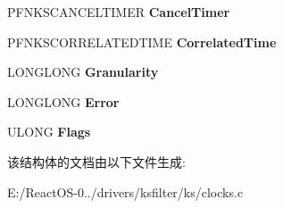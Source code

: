 \begin{DoxyCompactItemize}
P\+F\+N\+K\+S\+C\+A\+N\+C\+E\+L\+T\+I\+M\+ER {\bfseries Cancel\+Timer}
\item 
\mbox{\label{struct_k_s_i_d_e_f_a_u_l_t_c_l_o_c_k_a567669adb15a45915bfb7151dac7fe47}} 
P\+F\+N\+K\+S\+C\+O\+R\+R\+E\+L\+A\+T\+E\+D\+T\+I\+ME {\bfseries Correlated\+Time}
\item 
\mbox{\label{struct_k_s_i_d_e_f_a_u_l_t_c_l_o_c_k_abf29c368b4950bcdcbd4c32eb2d3ba41}} 
L\+O\+N\+G\+L\+O\+NG {\bfseries Granularity}
\item 
\mbox{\label{struct_k_s_i_d_e_f_a_u_l_t_c_l_o_c_k_ad7ea074a9b3ae8540d6d1be4d7dca30c}} 
L\+O\+N\+G\+L\+O\+NG {\bfseries Error}
\item 
\mbox{\label{struct_k_s_i_d_e_f_a_u_l_t_c_l_o_c_k_a713a556063e70584a73216e0a86ba029}} 
U\+L\+O\+NG {\bfseries Flags}
\end{DoxyCompactItemize}


该结构体的文档由以下文件生成\+:\begin{DoxyCompactItemize}
\item 
E\+:/\+React\+O\+S-\/0../drivers/ksfilter/ks/clocks.\+c\end{DoxyCompactItemize}
